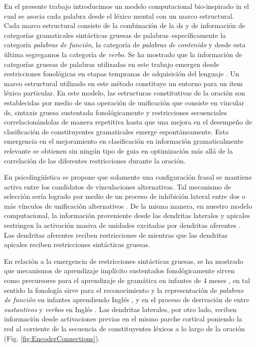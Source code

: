 {En el presente trabajo introducimos un modelo computacional bio-inspirado in el cual se asocia cada palabra desde el léxico mental con un marco estructural.
Cada marco estructural consiste de la combinación de la \gls{ds} \cite{doi:10.1080/00437956.1954.11659520} y de
información de categorías gramaticales sintácticas gruesas de palabras--específicamente la categoría \emph{palabras de función}, la categoría de \emph{palabras de contenido} y desde esta última segregamos la categoría de \emph{verbo}.
Se ha mostrado que la información de categorías gruesas de palabras utilizadas en este trabajo emergen desde restricciones fonológicas en etapas tempranas de adquisición del lenguaje \cite{doi:10.1207/s15327078in1002_5,lohmann_phonological_2017}.
Un marco estructural utilizado en este método constituye un  entorno para un item léxico particular.
En este modelo, las estructuras constitutivas de la oración son establecidas por medio de una operación de unificación que consiste en vincular \gls{ds},
sintaxis gruesa sustentada fonológicamente y restricciones secuenciales correlacionándolas de manera repetitiva hasta que una mejora en el desempeño de clasificación de constituyentes gramaticales emerge espontáneamente.
Esta emergencia en el mejoramiento en clasificación en información gramaticalmente relevante se obtienen sin ningún tipo de guia en optimización más allá de la correlación de las diferentes restricciones durante la oración.

En psicolingüística se propone que solamente una configuración frasal se mantiene activa entre los candidatos de vinculaciones alternativas.
Tal mecanismo de selección sería logrado por medio de un proceso de inhibición lateral entre dos o más vínculos de unificación alternativos \cite{Hagoort2005OnBB}.
De la misma manera, en nuestro modelo computacional, la información proveniente desde las dendritas laterales y apicales restringen la activación masiva de unidades excitadas por dendritas aferentes \cite{10.1371/journal.pone.0217966}.
Las dendritas aferentes reciben restricciones de  mientras que las dendritas apicales reciben restricciones sintácticas gruesas.

En relación a la emergencia de restricciones sintácticas gruesas, se ha mostrado que mecanismos de aprendizaje implícito sustentados fonológicamente sirven como precursores para el aprendizaje de gramática en infantes de 4 meses \cite{10.1371/journal.pone.0017920}, en tal sentido la fonología sirve para el reconocimiento y la representación de \emph{palabras de función} en infantes aprendiendo Inglés \cite{doi:10.1207/s15327078in1002_5}, y en el proceso de derivación de entre \emph{sustantivos} y \emph{verbos} en Inglés \cite{lohmann_phonological_2017}.
Las dendritas laterales, por otro lado, reciben información desde activaciones previas en el mismo parche cortical poniendo la red al corriente de la secuencia de constituyentes léxicos a lo largo de la oración (Fig. \ref{fig:EncoderConnections}).

}
